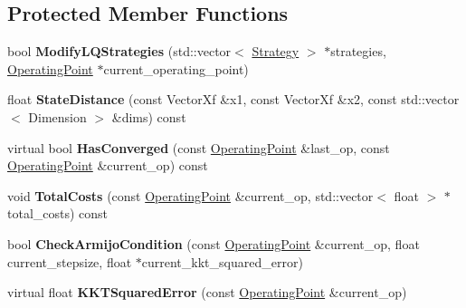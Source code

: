 \subsection*{Protected Member Functions}
\begin{DoxyCompactItemize}
\item 
bool {\bfseries Modify\+L\+Q\+Strategies} (std\+::vector$<$ \hyperlink{structilqgames_1_1_strategy}{Strategy} $>$ $\ast$strategies, \hyperlink{structilqgames_1_1_operating_point}{Operating\+Point} $\ast$current\+\_\+operating\+\_\+point)\hypertarget{classilqgames_1_1_i_l_q_solver_aacc4cfbccac0fb2eb344cadb03f76887}{}\label{classilqgames_1_1_i_l_q_solver_aacc4cfbccac0fb2eb344cadb03f76887}

\item 
float {\bfseries State\+Distance} (const Vector\+Xf \&x1, const Vector\+Xf \&x2, const std\+::vector$<$ Dimension $>$ \&dims) const \hypertarget{classilqgames_1_1_i_l_q_solver_aee7f2cfccde0664200d62f92ed5e0606}{}\label{classilqgames_1_1_i_l_q_solver_aee7f2cfccde0664200d62f92ed5e0606}

\item 
virtual bool {\bfseries Has\+Converged} (const \hyperlink{structilqgames_1_1_operating_point}{Operating\+Point} \&last\+\_\+op, const \hyperlink{structilqgames_1_1_operating_point}{Operating\+Point} \&current\+\_\+op) const \hypertarget{classilqgames_1_1_i_l_q_solver_a16009dd589014a579b8b8ec5cbe89e87}{}\label{classilqgames_1_1_i_l_q_solver_a16009dd589014a579b8b8ec5cbe89e87}

\item 
void {\bfseries Total\+Costs} (const \hyperlink{structilqgames_1_1_operating_point}{Operating\+Point} \&current\+\_\+op, std\+::vector$<$ float $>$ $\ast$total\+\_\+costs) const \hypertarget{classilqgames_1_1_i_l_q_solver_acf0f45f07d5484a9a60b3a2e1db1647a}{}\label{classilqgames_1_1_i_l_q_solver_acf0f45f07d5484a9a60b3a2e1db1647a}

\item 
bool {\bfseries Check\+Armijo\+Condition} (const \hyperlink{structilqgames_1_1_operating_point}{Operating\+Point} \&current\+\_\+op, float current\+\_\+stepsize, float $\ast$current\+\_\+kkt\+\_\+squared\+\_\+error)\hypertarget{classilqgames_1_1_i_l_q_solver_a4e7525bb720f83e255dac165f0bbeb57}{}\label{classilqgames_1_1_i_l_q_solver_a4e7525bb720f83e255dac165f0bbeb57}

\item 
virtual float {\bfseries K\+K\+T\+Squared\+Error} (const \hyperlink{structilqgames_1_1_operating_point}{Operating\+Point} \&current\+\_\+op)\hypertarget{classilqgames_1_1_i_l_q_solver_a9845b60307967eca6aa6897897d5ee69}{}\label{classilqgames_1_1_i_l_q_solver_a9845b60307967eca6aa6897897d5ee69}


\end{DoxyCompactItemize}
